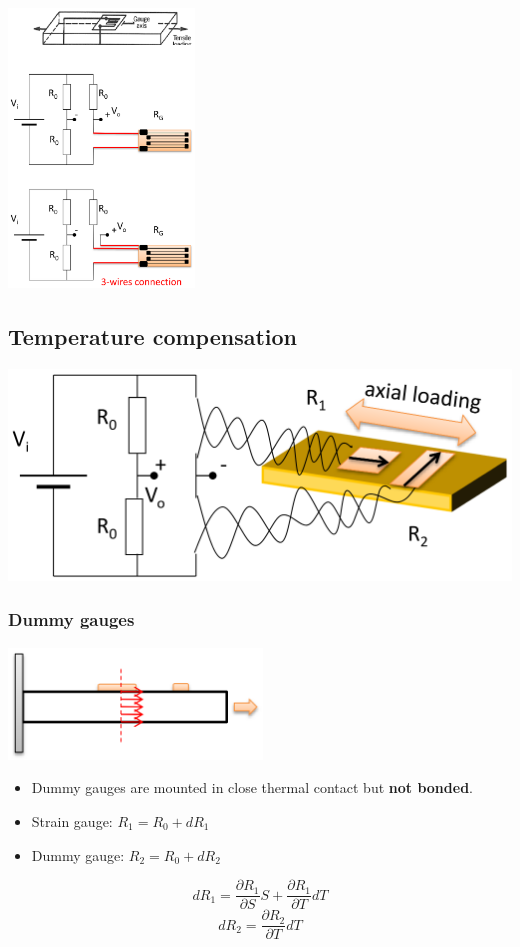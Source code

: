 \documentclass[11pt]{article}
\begin{document}
\begin{center}
\includegraphics[height=20em]{./images/quarter-bridge-connection-types-circuit-diagrams.png}
\end{center}
\subsection{Temperature compensation}
\label{sec:orgc6fbca7}
\begin{center}
\includegraphics[width=.9\linewidth]{./images/temperature-compensation-circuit-diagram.png}
\end{center}
\subsubsection{Dummy gauges}
\label{sec:org2611468}
\begin{center}
\includegraphics[height=8em]{./images/dummy-gauge-diagram.png}
\end{center}
\begin{itemize}
\item Dummy gauges are mounted in close thermal contact but \textbf{not bonded}.
\item Strain gauge: \(R_1 = R_0 + dR_1\)
\item Dummy gauge: \(R_2 = R_0 + dR_2\)
\end{itemize}
\[dR_1 = \frac{\partial R_1}{\partial S} S + \frac{\partial R_1}{\partial T} dT\]
\[dR_2 = \frac{\partial R_2}{\partial T} dT\]
\end{document}
